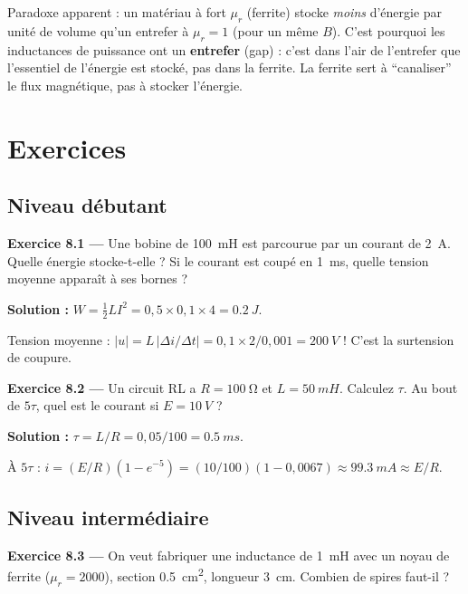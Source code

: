 \documentclass[12pt,a4paper,twoside]{book}
\begin{document}
\begin{attention}
Paradoxe apparent : un matériau à fort $\mu_r$ (ferrite) stocke \textit{moins} d'énergie par unité de volume qu'un entrefer à $\mu_r = 1$ (pour un même $B$). C'est pourquoi les inductances de puissance ont un \textbf{entrefer} (gap) : c'est dans l'air de l'entrefer que l'essentiel de l'énergie est stocké, pas dans la ferrite. La ferrite sert à ``canaliser'' le flux magnétique, pas à stocker l'énergie.
\end{attention}

\section*{Exercices}

\subsection*{Niveau débutant}

\textbf{Exercice 8.1 ---} Une bobine de \SI{100}{mH} est parcourue par un courant de \SI{2}{A}. Quelle énergie stocke-t-elle ? Si le courant est coupé en \SI{1}{ms}, quelle tension moyenne apparaît à ses bornes ?

\begin{pratique}
\textbf{Solution :} $W = \frac{1}{2}LI^2 = 0{,}5 \times 0{,}1 \times 4 = \SI{0.2}{J}$.

Tension moyenne : $|u| = L\,|\Delta i / \Delta t| = 0{,}1 \times 2/0{,}001 = \SI{200}{V}$ ! C'est la surtension de coupure.
\end{pratique}

\textbf{Exercice 8.2 ---} Un circuit RL a $R = \SI{100}{\ohm}$ et $L = \SI{50}{mH}$. Calculez $\tau$. Au bout de $5\tau$, quel est le courant si $E = \SI{10}{V}$ ?

\begin{pratique}
\textbf{Solution :} $\tau = L/R = 0{,}05/100 = \SI{0.5}{ms}$.

À $5\tau$ : $i = (E/R)(1 - e^{-5}) = (10/100)(1 - 0{,}0067) \approx \SI{99.3}{mA} \approx E/R$.
\end{pratique}

\subsection*{Niveau intermédiaire}

\textbf{Exercice 8.3 ---} On veut fabriquer une inductance de \SI{1}{mH} avec un noyau de ferrite ($\mu_r = 2000$), section \SI{0.5}{cm^2}, longueur \SI{3}{cm}. Combien de spires faut-il ?
\end{document}
